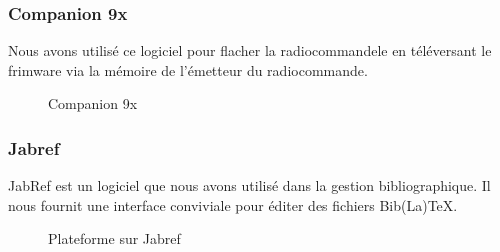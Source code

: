 	\subsubsection{Companion 9x}
	Nous avons utilisé ce logiciel pour flacher la radiocommandele en téléversant le frimware via la mémoire de l'émetteur du radiocommande.
	\begin{figure}[h]
		\begin{center}
			\centering
		\end{center}
		\caption{Companion 9x}
	\end{figure}
	\newpage
	\subsubsection{Jabref}
	JabRef est un logiciel que nous avons utilisé dans la gestion bibliographique. Il nous fournit une interface conviviale pour éditer des fichiers Bib(La)TeX.
	\begin{figure}[h]
		\begin{center}
			\centering
		\end{center}
		\caption{Plateforme sur Jabref}
	\end{figure}
